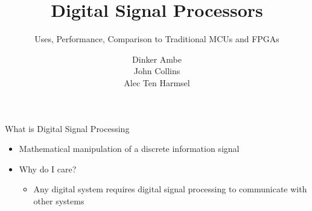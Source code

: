 \documentclass{beamer}
\begin{document}
\beamertemplatenavigationsymbolsempty

\title{Digital Signal Processors}
\subtitle{Uses, Performance, Comparison to Traditional MCUs and FPGAs}
\author{Dinker Ambe\\
    John Collins\\
Alec Ten Harmsel}
\date{}


\frame{\titlepage}

\begin{frame}{What is Digital Signal Processing}
    \begin{itemize}
        \item Mathematical manipulation of a discrete information signal
        \item Why do I care?
            \begin{itemize}
                \item Any digital system requires digital signal processing to communicate with other systems
            \end{itemize}
    \end{itemize}
\end{frame}
\end{document}
